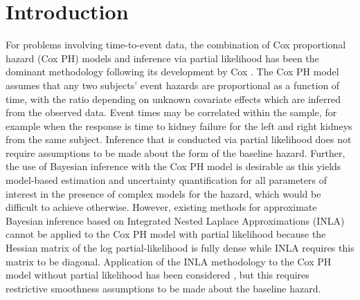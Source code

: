 \documentclass[ba]{imsart}
\begin{document}






%


\section{Introduction}\label{sec1}
For problems involving time-to-event data, the combination of Cox proportional hazard (Cox PH) models and inference via partial likelihood has been the dominant methodology following its development by Cox \citep{coxph}. The Cox PH model assumes that any two subjects' event hazards are proportional as a function of time, with the ratio depending on unknown covariate effects which are inferred from the observed data. Event times may be correlated within the sample, for example when the response is time to kidney failure for the left and right kidneys from the same subject. Inference that is conducted via partial likelihood does not require assumptions to be made about the form of the baseline hazard. Further, the use of Bayesian inference with the Cox PH model is desirable as this yields model-based estimation and uncertainty quantification for all parameters of interest in the presence of complex models for the hazard, which would be difficult to achieve otherwise. However, existing methods for approximate Bayesian inference based on Integrated Nested Laplace Approximations (INLA) \citep{inla} cannot be applied to the Cox PH model with partial likelihood because the Hessian matrix of the log partial-likelihood is fully dense while INLA requires this matrix to be diagonal. Application of the INLA methodology to the Cox PH model without partial likelihood has been considered \citep{inlacoxph}, but this requires restrictive smoothness assumptions to be made about the baseline hazard.
\end{document}
